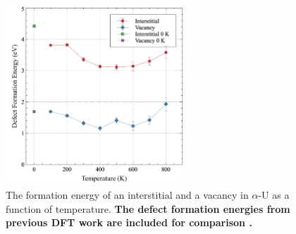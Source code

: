 \documentclass[utf8]{frontiersSCNS} %
\providecommand{\DIFaddtex}[1]{{\bf #1}} %
\providecommand{\DIFaddFL}[1]{\DIFadd{#1}} %
\providecommand{\DIFaddbeginFL}{} %
\providecommand{\DIFaddendFL}{} %
\providecommand{\DIFdelbeginFL}{} %
\providecommand{\DIFdelendFL}{} %
\providecommand{\DIFadd}[1]{\texorpdfstring{\DIFaddtex{#1}}{#1}} %
\begin{document}
 \begin{figure}[hbt]
	\centering
	\DIFdelbeginFL %
\DIFdelendFL \DIFaddbeginFL \includegraphics[width=0.6\textwidth]{defect_eform.jpg}
    \DIFaddendFL \caption{The formation energy of an interstitial and a vacancy in $\alpha$-U as a function of temperature. \DIFaddbeginFL \DIFaddFL{The defect formation energies from previous DFT work are included for comparison \cite{wirth2011}.}\DIFaddendFL }\label{fig:defs}
\end{figure}
\end{document}
